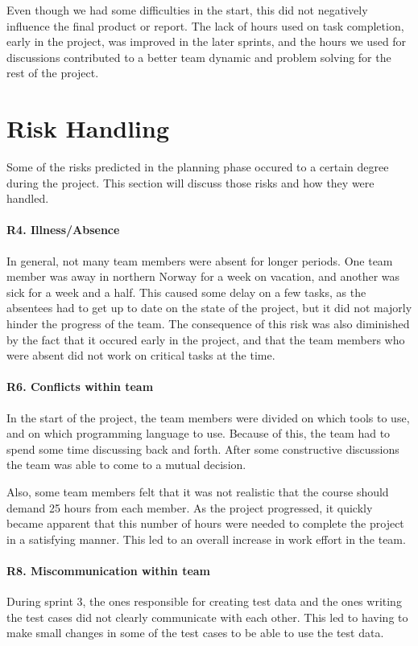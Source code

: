 Even though we had some difficulties in the start, this did not negatively influence the final product or report. The lack of hours used on task completion, early in the project, was improved in the later sprints, and the hours we used for discussions contributed to a better team dynamic and problem solving for the rest of the project. 

\section{Risk Handling}
Some of the risks predicted in the planning phase occured to a certain degree during the project.
This section will discuss those risks and how they were handled.

\paragraph{R4. Illness/Absence}
In general, not many team members were absent for longer periods.
One team member was away in northern Norway for a week on vacation, and another was sick for a week and a half. This caused some delay on a few tasks, as the absentees had to get up to date on the state of the project, but it did not majorly hinder the progress of the team. The consequence of this risk was also diminished by the fact that it occured early in the project, and that the team members who were absent did not work on critical tasks at the time.

\paragraph{R6. Conflicts within team}
In the start of the project, the team members were divided on which tools to use, and on which programming language to use. Because of this, the team had to spend some time discussing back and forth. After some constructive discussions the team was able to come to a mutual decision.

Also, some team members felt that it was not realistic that the course should demand 25 hours from each member. As the project progressed, it quickly became apparent that this number of hours were needed to complete the project in a satisfying manner. This led to an overall increase in work effort in the team.

\paragraph{R8. Miscommunication within team}
During sprint 3, the ones responsible for creating test data and the ones writing the test cases did not clearly communicate with each other. This led to having to make small changes in some of the test cases to be able to use the test data.


